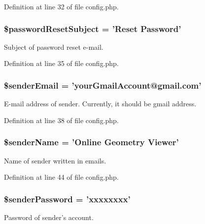 Definition at line 32 of file config.\-php.

\hypertarget{config_8php_a9adc6662fb3e02f099be0ba0628a3d16}{
\subsubsection[{\$password\-Reset\-Subject}]{\setlength{\rightskip}{0pt plus 5cm}\$password\-Reset\-Subject = 'Reset Password'}}\label{config_8php_a9adc6662fb3e02f099be0ba0628a3d16}
Subject of password reset e-\/mail. 

Definition at line 35 of file config.\-php.

\hypertarget{config_8php_a540edc1edfa3f436b0f805125e69d1fa}{
\subsubsection[{\$sender\-Email}]{\setlength{\rightskip}{0pt plus 5cm}\$sender\-Email = 'your\-Gmail\-Account@gmail.\-com'}}\label{config_8php_a540edc1edfa3f436b0f805125e69d1fa}
E-\/mail address of sender. Currently, it should be gmail address. 

Definition at line 38 of file config.\-php.

\hypertarget{config_8php_ac99178d2fd94439629e08538fd8d7e4d}{
\subsubsection[{\$sender\-Name}]{\setlength{\rightskip}{0pt plus 5cm}\$sender\-Name = 'Online Geometry Viewer'}}\label{config_8php_ac99178d2fd94439629e08538fd8d7e4d}
Name of sender written in emails. 

Definition at line 44 of file config.\-php.

\hypertarget{config_8php_ac332b0a6f5d1735f0b130d9169191189}{
\subsubsection[{\$sender\-Password}]{\setlength{\rightskip}{0pt plus 5cm}\$sender\-Password = 'xxxxxxxx'}}\label{config_8php_ac332b0a6f5d1735f0b130d9169191189}
Password of sender's account. 

